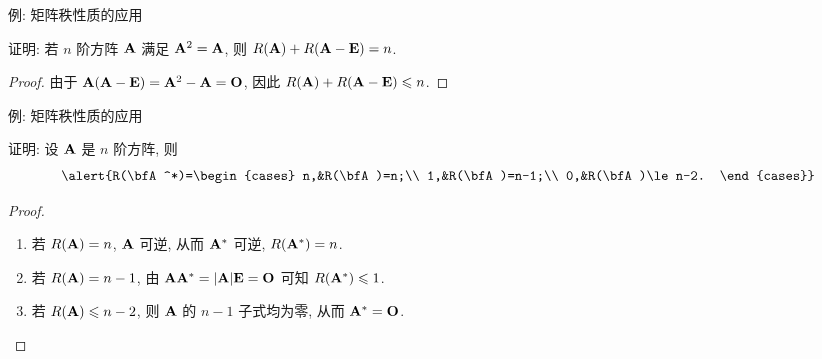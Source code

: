\begin{frame}{例: 矩阵秩性质的应用}
	\onslide<+->
	\begin{example}
		证明: 若 $n$ 阶方阵 ${\mathbf{A}}$ 满足 ${\mathbf{A}}^2={\mathbf{A}}$, 则 $R(\bfA)+R(\bfA-\bfE)=n$.
	\end{example}
	\onslide<+->
	\begin{proof}
		由于 ${\mathbf{A}}({\mathbf{A}}-{\mathbf{E}})={\mathbf{A}}^2-{\mathbf{A}}={\mathbf{O}}$, 因此 $R({\mathbf{A}})+R({\mathbf{A}}-{\mathbf{E}})\leqslant n$.
		\onslide<+->{%
			故 $R(\bfA)+R(\bfA-\bfE)=n$.\qedhere
		}
	\end{proof}
\end{frame}


\begin{frame}{例: 矩阵秩性质的应用}
	\onslide<+->
	\begin{example}
		证明: 设 ${\mathbf{A}}$ 是 $n$ 阶方阵, 则
		\[\alert{R(\bfA^*)=\begin{cases}
			n,&R(\bfA)=n;\\
			1,&R(\bfA)=n-1;\\
			0,&R(\bfA)\le n-2.
		\end{cases}}\]
	\end{example}
	\onslide<+->
	\begin{proof}
		\begin{enumerate}
			\item 若 $R({\mathbf{A}})=n$, ${\mathbf{A}}$ 可逆, 从而 ${\mathbf{A}}^*$ 可逆, $R({\mathbf{A}}^*)=n$.
			\item 若 $R({\mathbf{A}})=n-1$, 由 ${\mathbf{A}}{\mathbf{A}}^*=|{\mathbf{A}}|{\mathbf{E}}={\mathbf{O}}$ 可知 $R({\mathbf{A}}^*)\leqslant 1$.
			\onslide<+->{故 $R(\bfA^*)=1$.}
			\item 若 $R({\mathbf{A}})\leqslant n-2$, 则 ${\mathbf{A}}$ 的 $n-1$ 子式均为零, 从而 ${\mathbf{A}}^*={\mathbf{O}}$.\qedhere
		\end{enumerate}
	\end{proof}
\end{frame}


